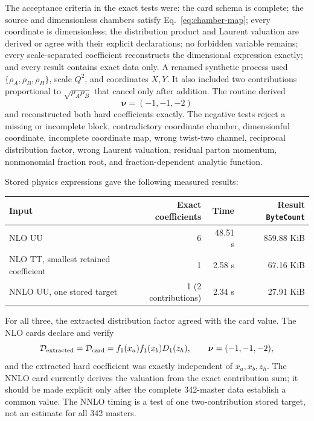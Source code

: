 \documentclass[11pt]{article}
\newcommand{\code}[1]{\texttt{#1}}
\begin{document}
The acceptance criteria in the exact tests were: the card schema is complete;
the source and dimensionless chambers satisfy Eq.~\eqref{eq:chamber-map}; every
coordinate is dimensionless; the distribution product and Laurent valuation
are derived or agree with their explicit declarations; no forbidden variable
remains; every scale-separated coefficient reconstructs the dimensional
expression exactly; and every result contains exact data only.  A renamed
synthetic process used
$\{\rho_A,\rho_B,\rho_H\}$, scale $Q^2$, and coordinates $X,Y$.  It also
included two contributions proportional to $\sqrt{\rho_A\rho_B}$ that cancel
only after addition.  The routine derived
\begin{equation}
  \boldsymbol\nu=(-1,-1,-2)
\end{equation}
and reconstructed both hard coefficients exactly.  The negative tests reject
a missing or incomplete block, contradictory coordinate chamber, dimensionful
coordinate, incomplete coordinate map, wrong twist-two channel, reciprocal
distribution factor, wrong Laurent valuation, residual parton momentum,
nonmonomial fraction root, and fraction-dependent analytic function.

Stored physics expressions gave the following measured results:
\begin{center}
\begin{tabular}{@{}lrrr@{}}
\toprule
Input & Exact coefficients & Time & Result \code{ByteCount} \\
\midrule
NLO UU & 6 & 48.51 s & 859.88 KiB \\
NLO TT, smallest retained coefficient & 1 & 2.58 s & 67.16 KiB \\
NNLO UU, one stored target & 1 (2 contributions) & 2.34 s & 27.91 KiB \\
\bottomrule
\end{tabular}
\end{center}
\par\medskip
For all three, the extracted distribution factor agreed with the card value.
The NLO cards declare and verify
\begin{equation}
  \mathcal D_{\rm extracted}=\mathcal D_{\rm card}
  =f_1(x_a)f_1(x_b)D_1(z_h),
  \qquad \boldsymbol\nu=(-1,-1,-2),
\end{equation}
and the extracted hard coefficient was exactly independent of
$x_a,x_b,z_h$.  The NNLO card currently derives the valuation from the exact
contribution sum; it should be made explicit only after the complete
342-master data establish a common value.  The NNLO timing is a test of one
two-contribution stored target, not an estimate for all 342 masters.
\end{document}
